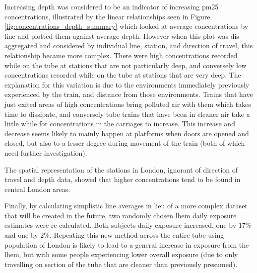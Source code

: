 Increasing depth was considered to be an indicator of increasing \gls{pm25} concentrations, illustrated by the linear relationships seen in Figure \ref{fig:concentrations_depth_summary} which looked at average concentrations by line and plotted them against average depth. However when this plot was dis-aggregated and considered by individual line, station, and direction of travel, this relationship became more complex. There were high concentrations recorded while on the tube at stations that are not particularly deep, and conversely low concentrations recorded while on the tube at stations that are very deep. The explanation for this variation is due to the environments immediately previously experienced by the train, and distance from those environments. Trains that have just exited areas of high concentrations bring polluted air with them which takes time to dissipate, and conversely tube trains that have been in cleaner air take a little while for concentrations in the carriages to increase. This increase and decrease seems likely to mainly happen at platforms when doors are opened and closed, but also to a lesser degree during movement of the train (both of which need further investigation).


The spatial representation of the stations in London, ignorant of direction of travel and depth data, showed that higher concentrations tend to be found in central London areas.


Finally, by calculating simplistic line averages in lieu of a more complex dataset that will be created in the future, two randomly chosen \gls{lhem} daily exposure estimates were re-calculated. Both subjects daily exposure increased, one by 17\% and one by 2\%. Repeating this new method across the entire tube-using population of London is likely to lead to a general increase in exposure from the \gls{lhem}, but with some people experiencing lower overall exposure (due to only travelling on section of the tube that are cleaner than previously presumed).